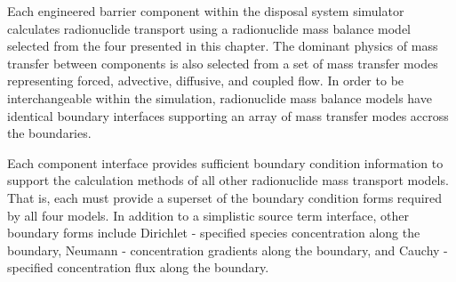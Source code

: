 Each engineered barrier component within the \Cyder disposal system simulator 
calculates radionuclide transport using a radionuclide mass balance model 
selected from the four presented in this chapter. The dominant physics of mass 
transfer between components is also selected from a set of mass transfer modes 
representing forced, advective, diffusive, and coupled flow.
In order to be interchangeable within the simulation, radionuclide mass balance 
models have identical boundary interfaces supporting an array of mass transfer 
modes accross the boundaries.

Each component interface provides sufficient boundary condition information to 
support the calculation methods of all other radionuclide mass transport models. That 
is, each must provide a superset of the boundary condition forms required by all 
four models. In addition to a simplistic source term interface, other 
boundary forms include Dirichlet - specified species concentration along the 
boundary, Neumann - concentration gradients along the boundary, and Cauchy - 
specified concentration flux along the boundary.
